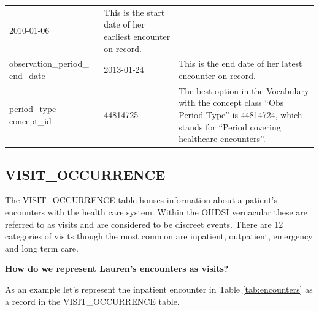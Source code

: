 \documentclass[11pt]{book}
\theoremstyle{definition}
\theoremstyle{definition}
\theoremstyle{definition}
\theoremstyle{remark}
\begin{document}
\begin{longtable}[]{@{}lll@{}}
\begin{minipage}[t]{0.15\columnwidth}
2010-01-06\strut
\end{minipage} & \begin{minipage}[t]{0.49\columnwidth}\raggedright
This is the start date of her earliest encounter on record.\strut
\end{minipage}\tabularnewline
\begin{minipage}[t]{0.28\columnwidth}\raggedright
observation\_period\_ end\_date\strut
\end{minipage} & \begin{minipage}[t]{0.15\columnwidth}\raggedright
2013-01-24\strut
\end{minipage} & \begin{minipage}[t]{0.49\columnwidth}\raggedright
This is the end date of her latest encounter on record.\strut
\end{minipage}\tabularnewline
\begin{minipage}[t]{0.28\columnwidth}\raggedright
period\_type\_ concept\_id\strut
\end{minipage} & \begin{minipage}[t]{0.15\columnwidth}\raggedright
44814725\strut
\end{minipage} & \begin{minipage}[t]{0.49\columnwidth}\raggedright
The best option in the Vocabulary with the concept class ``Obs Period Type'' is \href{http://athena.ohdsi.org/search-terms/terms/44814724}{44814724}, which stands for ``Period covering healthcare encounters''.\strut
\end{minipage}\tabularnewline
\bottomrule
\end{longtable}

\hypertarget{visitOccurrence}{%
\subsection{VISIT\_OCCURRENCE}\label{visitOccurrence}}

The VISIT\_OCCURRENCE table houses information about a patient's encounters with the health care system. Within the OHDSI vernacular these are referred to as visits and are considered to be discreet events. There are 12 categories of visits though the most common are inpatient, outpatient, emergency and long term care.

\textbf{How do we represent Lauren's encounters as visits?}

As an example let's represent the inpatient encounter in Table \ref{tab:encounters} as a record in the VISIT\_OCCURRENCE table.
\end{document}
